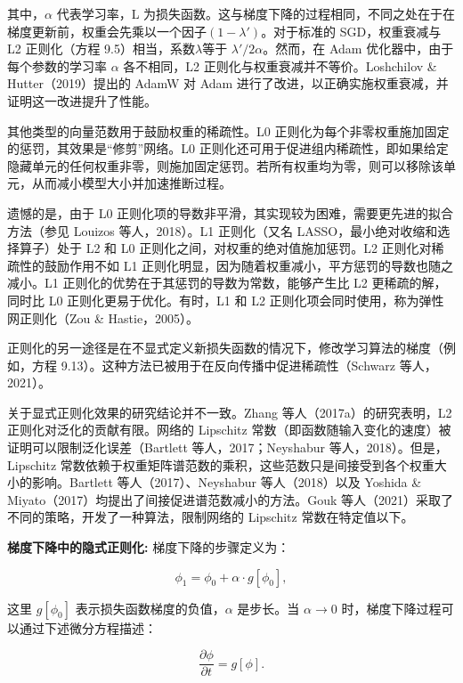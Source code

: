 \documentclass[lang=cn,newtx,10pt,scheme=chinese]{elegantbook}
\begin{document}
其中，\(\alpha\) 代表学习率，L 为损失函数。这与梯度下降的过程相同，不同之处在于在梯度更新前，权重会先乘以一个因子\((1−\lambda \prime)\)。对于标准的 SGD，权重衰减与 L2 正则化（方程 9.5）相当，系数\(\lambda\)等于 \(\lambda\prime/{2\alpha}\)。然而，在 Adam 优化器中，由于每个参数的学习率 \(\alpha\) 各不相同，L2 正则化与权重衰减并不等价。Loshchilov \& Hutter（2019）提出的 AdamW 对 Adam 进行了改进，以正确实施权重衰减，并证明这一改进提升了性能。

其他类型的向量范数用于鼓励权重的稀疏性。L0 正则化为每个非零权重施加固定的惩罚，其效果是“修剪”网络。L0 正则化还可用于促进组内稀疏性，即如果给定隐藏单元的任何权重非零，则施加固定惩罚。若所有权重均为零，则可以移除该单元，从而减小模型大小并加速推断过程。

遗憾的是，由于 L0 正则化项的导数非平滑，其实现较为困难，需要更先进的拟合方法（参见 Louizos 等人，2018）。L1 正则化（又名 LASSO，最小绝对收缩和选择算子）处于 L2 和 L0 正则化之间，对权重的绝对值施加惩罚。L2 正则化对稀疏性的鼓励作用不如 L1 正则化明显，因为随着权重减小，平方惩罚的导数也随之减小。L1 正则化的优势在于其惩罚的导数为常数，能够产生比 L2 更稀疏的解，同时比 L0 正则化更易于优化。有时，L1 和 L2 正则化项会同时使用，称为弹性网正则化（Zou \& Hastie，2005）。

正则化的另一途径是在不显式定义新损失函数的情况下，修改学习算法的梯度（例如，方程 9.13）。这种方法已被用于在反向传播中促进稀疏性（Schwarz 等人，2021）。

关于显式正则化效果的研究结论并不一致。Zhang 等人（2017a）的研究表明，L2 正则化对泛化的贡献有限。网络的 Lipschitz 常数（即函数随输入变化的速度）被证明可以限制泛化误差（Bartlett 等人，2017；Neyshabur 等人，2018）。但是，Lipschitz 常数依赖于权重矩阵谱范数的乘积，这些范数只是间接受到各个权重大小的影响。Bartlett 等人（2017）、Neyshabur 等人（2018）以及 Yoshida \& Miyato（2017）均提出了间接促进谱范数减小的方法。Gouk 等人（2021）采取了不同的策略，开发了一种算法，限制网络的 Lipschitz 常数在特定值以下。

\textbf{梯度下降中的隐式正则化:} 梯度下降的步骤定义为：

\begin{equation}
\phi_1 = \phi_0 + \alpha \cdot g[\phi_0], 
\end{equation}

这里 \(g[\phi_0]\) 表示损失函数梯度的负值，\(\alpha\) 是步长。当 \(\alpha \rightarrow 0\) 时，梯度下降过程可以通过下述微分方程描述：

\begin{equation}
\frac{\partial \phi}{\partial t} = g[\phi]. 
\end{equation}
\end{document}
